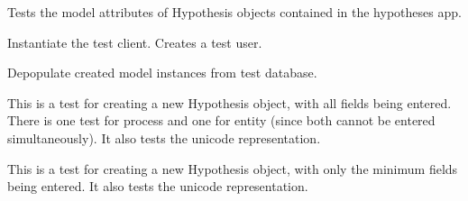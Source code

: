 \documentclass[letterpaper,10pt,english]{sphinxmanual}
\begin{document}
\begin{fulllineitems}
\label{api:experimentdb.hypotheses.tests.HypothesisModelTests}
Tests the model attributes of Hypothesis objects contained in the hypotheses app.


\begin{fulllineitems}
\label{api:experimentdb.hypotheses.tests.HypothesisModelTests.setUp}
Instantiate the test client.  Creates a test user.


\end{fulllineitems}


\begin{fulllineitems}
\label{api:experimentdb.hypotheses.tests.HypothesisModelTests.tearDown}
Depopulate created model instances from test database.


\end{fulllineitems}


\begin{fulllineitems}
\label{api:experimentdb.hypotheses.tests.HypothesisModelTests.test_create_hypothesis_all_fields_process}
This is a test for creating a new Hypothesis object, with all fields being entered.  There is one test for process and one for entity (since both cannot be entered simultaneously).  It also tests the unicode representation.


\end{fulllineitems}


\begin{fulllineitems}
\label{api:experimentdb.hypotheses.tests.HypothesisModelTests.test_create_hypothesis_minimal}
This is a test for creating a new Hypothesis object, with only the minimum fields being entered.  It also tests the unicode representation.


\end{fulllineitems}


\end{fulllineitems}
\end{document}
